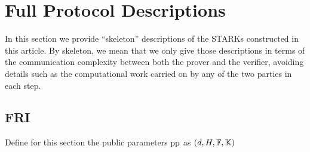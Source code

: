 

\section{Full Protocol Descriptions}\label{sec:full-descriptions}

In this section we provide ``skeleton'' descriptions of the STARKs constructed in this article. By skeleton, we mean that we only give those descriptions in terms of the communication complexity between both the prover and the verifier, avoiding details such as the computational work carried on by any of the two parties in each step. 


\subsection{FRI}\label{sec:FRI-protocols}

Define for this section the public parameters $\text{pp}$ as $(d,H,\mathbb{F},\mathbb{K})$

